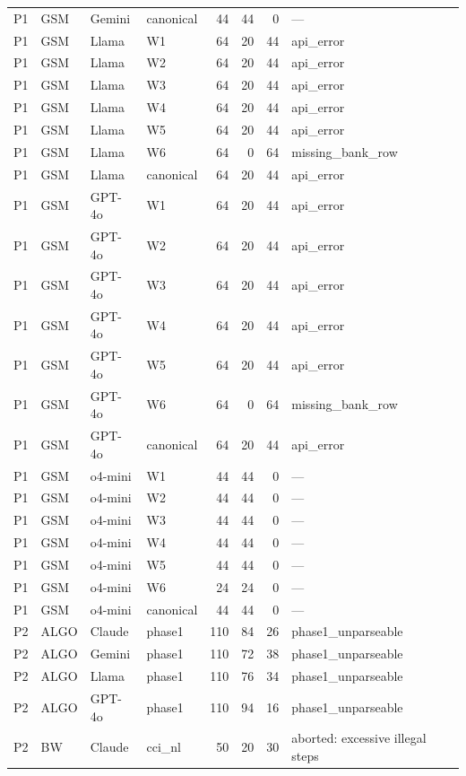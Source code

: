 \begin{table}[t]
\begin{tabular}{llllrrrl}
    P1 & GSM & Gemini & canonical & 44 & 44 & 0 & --- \\
    P1 & GSM & Llama & W1 & 64 & 20 & 44 & api\_error \\
    P1 & GSM & Llama & W2 & 64 & 20 & 44 & api\_error \\
    P1 & GSM & Llama & W3 & 64 & 20 & 44 & api\_error \\
    P1 & GSM & Llama & W4 & 64 & 20 & 44 & api\_error \\
    P1 & GSM & Llama & W5 & 64 & 20 & 44 & api\_error \\
    P1 & GSM & Llama & W6 & 64 & 0 & 64 & missing\_bank\_row \\
    P1 & GSM & Llama & canonical & 64 & 20 & 44 & api\_error \\
    P1 & GSM & GPT-4o & W1 & 64 & 20 & 44 & api\_error \\
    P1 & GSM & GPT-4o & W2 & 64 & 20 & 44 & api\_error \\
    P1 & GSM & GPT-4o & W3 & 64 & 20 & 44 & api\_error \\
    P1 & GSM & GPT-4o & W4 & 64 & 20 & 44 & api\_error \\
    P1 & GSM & GPT-4o & W5 & 64 & 20 & 44 & api\_error \\
    P1 & GSM & GPT-4o & W6 & 64 & 0 & 64 & missing\_bank\_row \\
    P1 & GSM & GPT-4o & canonical & 64 & 20 & 44 & api\_error \\
    P1 & GSM & o4-mini & W1 & 44 & 44 & 0 & --- \\
    P1 & GSM & o4-mini & W2 & 44 & 44 & 0 & --- \\
    P1 & GSM & o4-mini & W3 & 44 & 44 & 0 & --- \\
    P1 & GSM & o4-mini & W4 & 44 & 44 & 0 & --- \\
    P1 & GSM & o4-mini & W5 & 44 & 44 & 0 & --- \\
    P1 & GSM & o4-mini & W6 & 24 & 24 & 0 & --- \\
    P1 & GSM & o4-mini & canonical & 44 & 44 & 0 & --- \\
    P2 & ALGO & Claude & phase1 & 110 & 84 & 26 & phase1\_unparseable \\
    P2 & ALGO & Gemini & phase1 & 110 & 72 & 38 & phase1\_unparseable \\
    P2 & ALGO & Llama & phase1 & 110 & 76 & 34 & phase1\_unparseable \\
    P2 & ALGO & GPT-4o & phase1 & 110 & 94 & 16 & phase1\_unparseable \\
    P2 & BW & Claude & cci\_nl & 50 & 20 & 30 & aborted: excessive illegal steps \\

\end{tabular}
\end{table}
